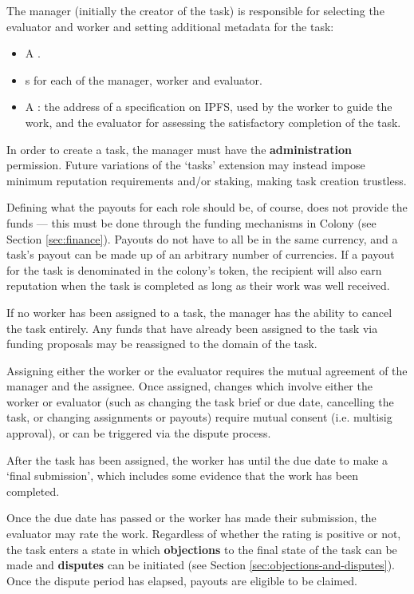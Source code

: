 The manager (initially the creator of the task) is responsible for selecting the evaluator and worker and setting additional metadata for the task:

\begin{itemize}
\item A .
\item {}s for each of the manager, worker and evaluator.
\item A : the address of a specification on IPFS, used by the worker to guide the work, and the evaluator for assessing the satisfactory completion of the task.
\end{itemize}

In order to create a task, the manager must have the \textbf{administration} permission. Future variations of the `tasks' extension may instead impose minimum reputation requirements and/or staking, making task creation trustless.

Defining what the payouts for each role should be, of course, does not provide the funds --- this must be done through the funding mechanisms in Colony (see Section \ref{sec:finance}). Payouts do not have to all be in the same currency, and a task's payout can be made up of an arbitrary number of currencies. If a payout for the task is denominated in the colony's token, the recipient will also earn reputation when the task is completed as long as their work was well received.

If no worker has been assigned to a task, the manager has the ability to cancel the task entirely. Any funds that have already been assigned to the task via funding proposals may be reassigned to the domain of the task.

Assigning either the worker or the evaluator requires the mutual agreement of the manager and the assignee. Once assigned, changes which involve either the worker or evaluator (such as changing the task brief or due date, cancelling the task, or changing assignments or payouts) require mutual consent (i.e. multisig approval), or can be triggered via the dispute process.

After the task has been assigned, the worker has until the due date to make a `final submission', which includes some evidence that the work has been completed.

Once the due date has passed or the worker has made their submission, the evaluator may rate the work. Regardless of whether the rating is positive or not, the task enters a state in which \textbf{objections} to the final state of the task can be made and \textbf{disputes} can be initiated (see Section \ref{sec:objections-and-disputes}). Once the dispute period has elapsed, payouts are eligible to be claimed. \\

